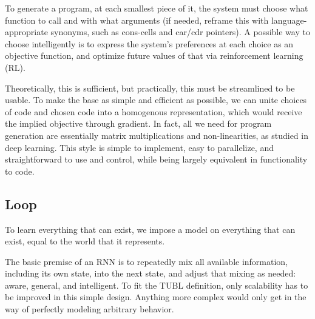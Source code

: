 \documentclass{article}
\begin{document}
\begin{itemize}
To generate a program, at each smallest piece of it, the system must choose what function to call and with what arguments (if needed, reframe this with language-appropriate synonyms, such as cons-cells and car/cdr pointers). A possible way to choose intelligently is to express the system's preferences at each choice as an objective function, and optimize future values of that via reinforcement learning (RL).

Theoretically, this is sufficient, but practically, this must be streamlined to be usable. To make the base as simple and efficient as possible, we can unite choices of code and chosen code into a homogenous representation, which would receive the implied objective through gradient. In fact, all we need for program generation are essentially matrix multiplications and non-linearities, as studied in deep learning. This style is simple to implement, easy to parallelize, and straightforward to use and control, while being largely equivalent in functionality to code.
\end{itemize}

\subsection{Loop\label{Loop}}

To learn everything that can exist, we impose a model on everything that can exist, equal to the world that it represents.

The basic premise of an RNN is to repeatedly mix all available information, including its own state, into the next state, and adjust that mixing as needed: aware, general, and intelligent. To fit the TUBL definition, only scalability has to be improved in this simple design. Anything more complex would only get in the way of perfectly modeling arbitrary behavior.
\end{document}

